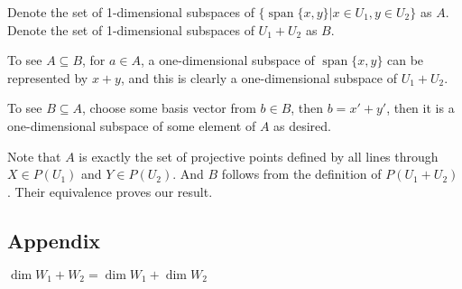 \documentclass[10pt]{article}
\begin{document}
\begin{exercise}

	Denote the set of 1-dimensional subspaces of $\{ \operatorname{span} \{x, y\} | x \in U_1,
y \in U_2 \}$ as $A$. Denote the set of 1-dimensional subspaces of $U_1 +
U_2$ as $B$.

To see $A \subseteq B$, for $a \in A$, a one-dimensional subspace of
$\operatorname{span} \{x, y\}$ can be represented by $x + y$, and this is clearly a
one-dimensional subspace of $U_1 + U_2$.

To see $B \subseteq A$, choose some basis vector from $b \in B$, then $b = x'
+ y'$, then it is a one-dimensional subspace of some element of $A$ as
desired.

Note that $A$ is exactly the set of projective points defined by all lines
through $X \in P(U_1)$ and $Y \in P(U_2)$. And $B$ follows from the definition
of $P(U_1 + U_2)$. Their equivalence proves our result.

\end{exercise}

\subsection{Appendix}

\begin{theorem}
	$\dim W_1 + W_2 = \dim W_1 + \dim W_2$
\end{theorem}
\end{document}
